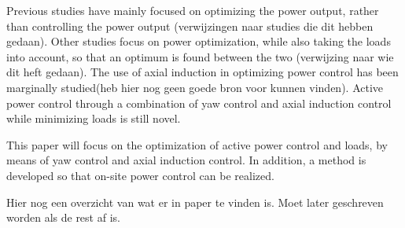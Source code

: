 Previous studies have mainly focused on optimizing the power output, rather than controlling the power output (verwijzingen naar studies die dit hebben gedaan).  Other studies focus on power optimization, while also taking the loads into account, so that an optimum is found between the two (verwijzing naar wie dit heft gedaan). The use of axial induction in optimizing power control has been marginally studied(heb hier nog geen goede bron voor kunnen vinden). Active power control through a combination of yaw control and axial induction control while minimizing loads is still novel.

This paper will focus on the optimization of active power control and loads, by means of yaw control and axial induction control. In addition, a method is developed so that on-site power control can be realized.
	
Hier nog een overzicht van wat er in paper te vinden is. Moet later geschreven worden als de rest af is.